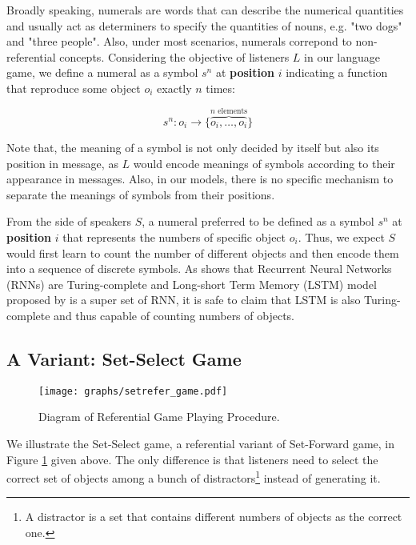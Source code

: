 Broadly speaking, numerals are words that can describe the numerical quantities and usually act as determiners to specify the quantities of nouns, e.g. "two dogs" and "three people". Also, under most scenarios, numerals correpond to non-referential concepts\cite{da2016wow}. Considering the objective of listeners $L$ in our language game, we define a numeral as a symbol $s^n$ at \textbf{position} $i$ indicating a function that reproduce some object $o_i$ exactly $n$ times:

\begin{equation}
  s^n: o_i \rightarrow \{\overbrace{o_i, \dots, o_i}^{n \mbox{ elements}}\}
  \label{eq:3.1numeral_define}
\end{equation}

Note that, the meaning of a symbol is not only decided by itself but also its position in message, as $L$ would encode meanings of symbols according to their appearance in messages. Also, in our models, there is no specific mechanism to separate the meanings of symbols from their positions.

From the side of speakers $S$, a numeral preferred to be defined as a symbol $s^n$ at \textbf{position} $i$ that represents the numbers of specific object $o_i$. Thus, we expect $S$ would first learn to count the number of different objects and then encode them into a sequence of discrete symbols. As \cite{Siegelmann1992NN} shows that Recurrent Neural Networks (RNNs) are Turing-complete and Long-short Term Memory (LSTM) model proposed by \cite{hochreiter1997long} is a super set of RNN, it is safe to claim that LSTM is also Turing-complete and thus capable of counting numbers of objects.

\subsection{A Variant: Set-Select Game}
\label{ssec:3.1.3:refer_game}

\begin{figure}[!h]
  \centering
  \texttt{[image: graphs/setrefer\_game.pdf]}
  \caption{Diagram of Referential Game Playing Procedure.}
  \label{fig3:refer_game_procedure}
\end{figure}

We illustrate the Set-Select game, a referential variant of Set-Forward game, in Figure \ref{fig3:refer_game_procedure} given above. The only difference is that listeners need to select the correct set of objects among a bunch of distractors\footnote{A distractor is a set that contains different numbers of objects as the correct one.} instead of generating it. 

